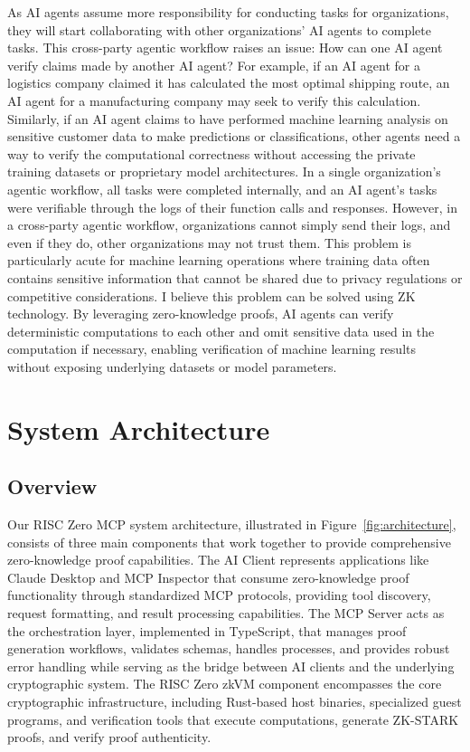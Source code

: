 \documentclass[11pt]{article}
\begin{document}
As AI agents assume more responsibility for conducting tasks for organizations, they will start collaborating with other organizations' AI agents to complete tasks. This cross-party agentic workflow raises an issue: How can one AI agent verify claims made by another AI agent? For example, if an AI agent for a logistics company claimed it has calculated the most optimal shipping route, an AI agent for a manufacturing company may seek to verify this calculation. Similarly, if an AI agent claims to have performed machine learning analysis on sensitive customer data to make predictions or classifications, other agents need a way to verify the computational correctness without accessing the private training datasets or proprietary model architectures. In a single organization's agentic workflow, all tasks were completed internally, and an AI agent's tasks were verifiable through the logs of their function calls and responses. However, in a cross-party agentic workflow, organizations cannot simply send their logs, and even if they do, other organizations may not trust them. This problem is particularly acute for machine learning operations where training data often contains sensitive information that cannot be shared due to privacy regulations or competitive considerations. I believe this problem can be solved using ZK technology. By leveraging zero-knowledge proofs, AI agents can verify deterministic computations to each other and omit sensitive data used in the computation if necessary, enabling verification of machine learning results without exposing underlying datasets or model parameters. 

\section{System Architecture}
\label{sec:architecture}

\subsection{Overview}

Our RISC Zero MCP system architecture, illustrated in Figure~\ref{fig:architecture}, consists of three main components that work together to provide comprehensive zero-knowledge proof capabilities. The AI Client represents applications like Claude Desktop and MCP Inspector that consume zero-knowledge proof functionality through standardized MCP protocols, providing tool discovery, request formatting, and result processing capabilities. The MCP Server acts as the orchestration layer, implemented in TypeScript, that manages proof generation workflows, validates schemas, handles processes, and provides robust error handling while serving as the bridge between AI clients and the underlying cryptographic system. The RISC Zero zkVM component encompasses the core cryptographic infrastructure, including Rust-based host binaries, specialized guest programs, and verification tools that execute computations, generate ZK-STARK proofs, and verify proof authenticity.
\end{document}
